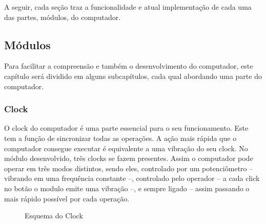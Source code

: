 A seguir, cada seção traz a funcionalidade e atual implementação de cada uma das partes, módulos, do computador.





\subsection{Módulos}
Para facilitar a compreensão e também o desenvolvimento do computador, este capítulo será dividido em alguns subcapítulos, cada qual abordando uma parte do computador.

\subsubsection{Clock}
O clock do computador é uma parte essencial para o seu funcionamento. Este tem a função de sincronizar todas as operações. A ação mais rápida que o computador consegue executar é equivalente a uma vibração do seu clock. No módulo desenvolvido, três clocks se fazem presentes. Assim o computador pode operar em três modos distintos, sendo eles, controlado por um potenciômetro – vibrando em uma frequência constante –, controlado pelo operador – a cada click no botão o modulo emite uma vibração –, e sempre ligado – assim passando o mais rápido possível por cada operação.

\vspace{1cm}
\begin{figure}[H] \centering 
  \caption{\label{schematics_clock} Esquema do Clock} 
\end{figure}

